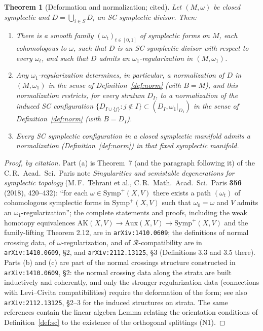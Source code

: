 \documentclass[11pt]{amsart}
\theoremstyle{plain}
\newtheorem{theorem}{Theorem}[section]
\theoremstyle{definition}
\newcommand{\Symp}{\mathrm{Symp}}
\newcommand{\AK}{\mathrm{AK}}
\begin{document}
\begin{theorem}[Deformation and normalization; cited]\label{thm:dst}
Let $(M,\omega)$ be closed symplectic and $D=\bigcup_{i\in S}D_i$ an SC
symplectic divisor. Then:
\begin{enumerate}
\item[(a)] There is a smooth family $(\omega_t)_{t\in[0,1]}$ of symplectic
forms on $M$, each cohomologous to $\omega$, such that $D$ is an SC
symplectic divisor with respect to every $\omega_t$, and such that $D$ admits
an $\omega_1$-\emph{regularization} in $(M,\omega_1)$.
\item[(b)] Any $\omega_1$-regularization determines, in particular, a
normalization of $D$ in $(M,\omega_1)$ in the sense of
Definition~\ref{def:norm} (with $B=M$), and this normalization restricts, for
every stratum $D_I$, to a normalization of the induced SC configuration
$\{D_{I\cup\{j\}}:j\notin I\}\subset(D_I,\omega_1|_{D_I})$ in the sense of
Definition~\ref{def:norm} (with $B=D_I$).
\item[(c)] Every SC symplectic configuration in a closed symplectic manifold
admits a normalization (Definition~\ref{def:norm}) in that fixed symplectic
manifold.
\end{enumerate}
\end{theorem}

\begin{proof}[Proof, by citation]
Part (a) is Theorem~7 (and the paragraph following it) of the C.\,R.\ Acad.\
Sci.\ Paris note \emph{Singularities and semistable degenerations for
symplectic topology} (M.\,F.\ Tehrani et al., C.\,R.\ Math.\ Acad.\ Sci.\
Paris \textbf{356} (2018), 420--432): ``for each
$\omega\in\Symp^+(X,V)$ there exists a path $(\omega_t)$ of cohomologous
symplectic forms in $\Symp^+(X,V)$ such that $\omega_0=\omega$ and $V$ admits
an $\omega_1$-regularization''; the complete statements and proofs,
including the weak homotopy equivalences
$\AK(X,V)\to\mathrm{Aux}(X,V)\to\Symp^+(X,V)$ and the family-lifting
Theorem 2.12, are in \texttt{arXiv:1410.0609}; the definitions of
normal crossing data, of $\omega$-regularization, and of
$\mathcal R$-compatibility are in \texttt{arXiv:1410.0609}, \S2, and
\texttt{arXiv:2112.13125}, \S3 (Definitions 3.3 and 3.5 there). Parts (b) and
(c) are part of the normal crossings structure constructed in
\texttt{arXiv:1410.0609}, \S2: the normal crossing data along the strata are
built inductively and coherently, and only the stronger regularization data
(connections with Levi--Civita compatibilities) require the deformation of
the form; see also \texttt{arXiv:2112.13125}, \S2--3 for the induced
structures on strata. The same references contain the linear algebra
Lemma relating the orientation conditions of Definition~\ref{def:sc} to the
existence of the orthogonal splittings (N1).
\end{proof}
\end{document}

